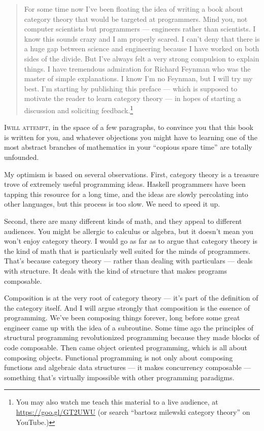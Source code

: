 
\begin{quote}
  For some time now I've been floating the idea of writing a book about
  category theory that would be targeted at programmers. Mind you, not
  computer scientists but programmers --- engineers rather than
  scientists. I know this sounds crazy and I am properly scared. I can't
  deny that there is a huge gap between science and engineering because I
  have worked on both sides of the divide. But I've always felt a very
  strong compulsion to explain things. I have tremendous admiration for
  Richard Feynman who was the master of simple explanations. I know I'm no
  Feynman, but I will try my best. I'm starting by publishing this preface
  --- which is supposed to motivate the reader to learn category theory
  --- in hopes of starting a discussion and soliciting feedback.\footnote{
    You may also watch me teach this material to a live audience, at
    \href{https://goo.gl/GT2UWU}{https://goo.gl/GT2UWU} (or search
    ``bartosz milewski category theory'' on YouTube.)}
\end{quote}

\lettrine[lhang=0.17]{I}{will attempt}, in the space of a few paragraphs,
to convince you that this book is written for you, and whatever
objections you might have to learning one of the most abstract branches
of mathematics in your ``copious spare time'' are totally unfounded.

My optimism is based on several observations. First, category theory is
a treasure trove of extremely useful programming ideas. Haskell
programmers have been tapping this resource for a long time, and the
ideas are slowly percolating into other languages, but this process is
too slow. We need to speed it up.

Second, there are many different kinds of math, and they appeal to
different audiences. You might be allergic to calculus or algebra, but
it doesn't mean you won't enjoy category theory. I would go as far as
to argue that category theory is the kind of math that is particularly
well suited for the minds of programmers. That's because category theory
--- rather than dealing with particulars --- deals with structure. It
deals with the kind of structure that makes programs composable.

Composition is at the very root of category theory --- it's part of the
definition of the category itself. And I will argue strongly that
composition is the essence of programming. We've been composing things
forever, long before some great engineer came up with the idea of a
subroutine. Some time ago the principles of structural programming
revolutionized programming because they made blocks of code composable.
Then came object oriented programming, which is all about composing
objects. Functional programming is not only about composing functions
and algebraic data structures --- it makes concurrency composable ---
something that's virtually impossible with other programming paradigms.

